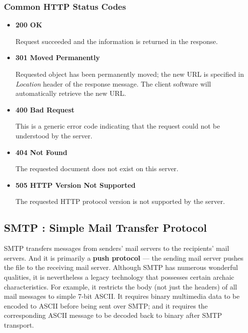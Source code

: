 \documentclass[11pt]{article}
\begin{document}
\subsubsection{Common HTTP Status Codes}

\begin{itemize}
	\item \textbf{200 OK}
	
	Request succeeded and the information is returned in the response.
	
	\item \textbf{301 Moved Permanently}
	
	Requested object has been permanently moved; the new URL is specified in \textit{Location} header of the response message. The client software will automatically retrieve the new URL.
	
	\item \textbf{400 Bad Request}
	
	This is a generic error code indicating that the request could not be understood by the server.
	
	\item \textbf{404 Not Found}
	
	The requested document does not exist on this server.
	
	\item \textbf{505 HTTP Version Not Supported}
	
	 The requested HTTP protocol version is not supported by the server.
	 
\end{itemize}

\subsection{SMTP : Simple Mail Transfer Protocol}

SMTP transfers messages from senders’ mail servers to the recipients’ mail servers.
And it is primarily a \textbf{push protocol} --- the sending mail server pushes the file to the receiving mail server.
Although SMTP has numerous wonderful qualities, it is nevertheless a legacy technology that possesses certain archaic characteristics. For example, it restricts the body (not just the headers) of all mail messages to simple 7-bit ASCII. It requires binary multimedia data to be encoded to ASCII before being sent over SMTP; and it requires the corresponding ASCII message to be decoded back to binary after SMTP transport.

~\
\end{document}
